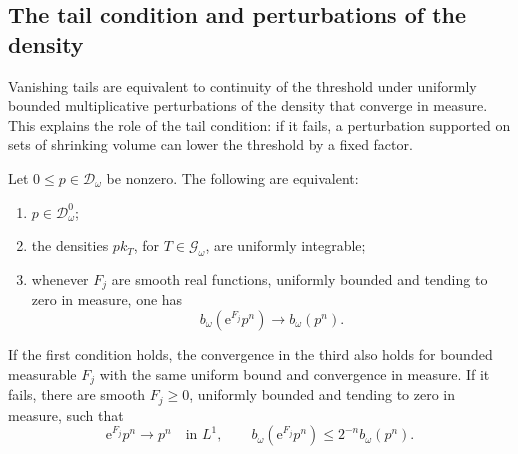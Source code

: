 \subsection{The tail condition and perturbations of the density}

Vanishing tails are equivalent to continuity of the threshold under uniformly bounded multiplicative perturbations of the density that converge in measure. This explains the role of the tail condition: if it fails, a perturbation supported on sets of shrinking volume can lower the threshold by a fixed factor.

\begin{proposition}\label{prop:root-tail-continuity}
Let $0\leq p\in\mathcal D_\omega$ be nonzero. The following are equivalent:
\begin{enumerate}
\item $p\in\mathcal D_\omega^0$;
\item the densities $p k_T$, for $T\in\mathscr G_\omega$, are uniformly integrable;
\item whenever $F_j$ are smooth real functions, uniformly bounded and tending to zero in measure, one has
\[
 b_\omega(\mathrm{e}^{F_j}p^n)\longrightarrow b_\omega(p^n).
\]
\end{enumerate}
If the first condition holds, the convergence in the third also holds for bounded measurable $F_j$ with the same uniform bound and convergence in measure. If it fails, there are smooth $F_j\geq0$, uniformly bounded and tending to zero in measure, such that
\[
 \mathrm{e}^{F_j}p^n\longrightarrow p^n\quad\text{in }L^1,
 \qquad
 b_\omega(\mathrm{e}^{F_j}p^n)\leq2^{-n}b_\omega(p^n).
\]
\end{proposition}
